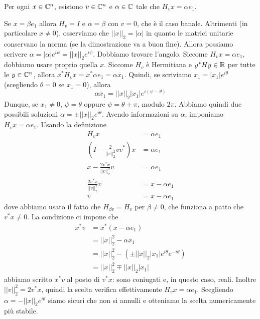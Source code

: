 \documentclass[a4paper]{article}
\begin{document}
\begin{snippettheorem}{}
    Per ogni \(x \in \mathbb{C}^n\),
    esistono \(v \in \mathbb{C}^n\)
    e \(\alpha \in \mathbb{C}\) tale che \(H_vx = \alpha e_1\).
\end{snippettheorem}

\begin{snippetproof}{}
    Se \(x = \beta e_1\) allora \(H_v = I\) e \(\alpha = \beta\) con \(v=0\),
    che è il caso banale.
    Altrimenti (in particolare \(x \neq 0\)), osserviamo che
    \(||x||_2 = |\alpha|\) in quanto le matrici unitarie conservano la norma
    (se la dimostrazione va a buon fine).
    Allora possiamo scrivere \(\alpha = |\alpha|e^{i\psi} = ||x||_2 e^{i\psi}\).
    Dobbiamo trovare l'angolo.
    Siccome \(H_vx = \alpha e_1\), dobbiamo usare proprio quella \(x\).
    Siccome \(H_v\) è Hermitiana e \(y^* H y \in \mathbb{R}\)
    per tutte le \(y \in \mathbb{C}^n\),
    allora \(x^* H_v x = x^* \alpha e_1 = \alpha \overline{x}_1\).
    Quindi, se scriviamo \(x_1 = |x_1| e^{i\theta}\) (scegliendo \(\theta=0\) se \(x_1=0\)),
    allora \[\alpha \overline{x}_1 = ||x||_2 |x_1| e^{i(\psi - \theta)}\]
    Dunque, se \(x_1\neq 0\), \(\psi = \theta\) oppure \(\psi = \theta + \pi\), modulo \(2\pi\).
    Abbiamo quindi due possibili soluzioni
    \(\alpha = \pm ||x||_2 e^{i\theta}\).
    Avendo informazioni su \(\alpha\), imponiamo \(H_v x = \alpha e_1\).
    Usando la definizione
    \begin{align*}
        H_v x &= \alpha e_1 \\
        \left(I - \frac{2}{||v||_2^2}vv^*\right)x &= \alpha e_1 \\
        x - \frac{2v^* x}{||v||_2^2} v &= \alpha e_1 \\
        \frac{2v^* x}{||v||_2^2} v &= x - \alpha e_1 \\
        v &= x - \alpha e_1
    \end{align*}
    dove abbiamo usato il fatto che \(H_{\beta v} = H_v\) per \(\beta \neq 0\), che funziona a patto che \(v^*x \neq 0\).
    La condizione ci impone che
    \begin{align*}
        x^* v &= x^*(x-\alpha e_1) \\
        &= ||x||_2^2 - \alpha \overline x_1 \\
        &= ||x||_2^2 - (\pm ||x||_2 |x_1| e^{i\theta}e^{-i\theta}) \\
        &= ||x||_2^2 \mp ||x||_2 |x_1|
    \end{align*}
    abbiamo scritto \(x^*v\) al posto di \(v^*x\): sono coniugati e, in questo caso, reali. Inoltre \(||v||_2^2=2v^*x\), quindi la scelta verifica effettivamente \(H_vx=\alpha e_1\).
    Scegliendo \(\alpha = - ||x||_2 e^{i\theta}\) siamo sicuri che non si annulli
    e otteniamo la scelta numericamente più stabile.
\end{snippetproof}
\end{document}
